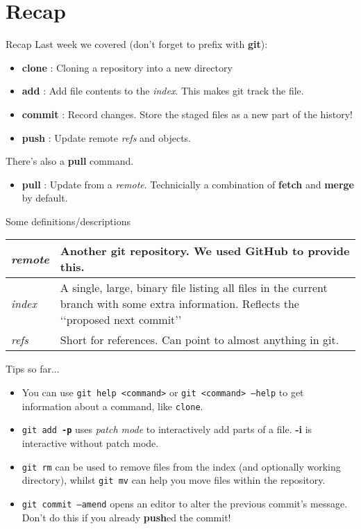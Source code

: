 \documentclass{beamer}
\begin{document}
\section{Recap}
\begin{frame}{Recap}
  Last week we covered (don't forget to prefix with \textbf{git}):
  \begin{itemize}
    \item \textbf{clone} : Cloning a repository into a new directory
    \item \textbf{add} : Add file contents to the \textit{index}. This makes git track the file.
    \item \textbf{commit} : Record changes. Store the staged files as a new part of the history!
    \item \textbf{push} : Update remote \textit{refs} and objects.
	\end{itemize}
	There\rq{}s also a \textbf{pull} command.
	\begin{itemize}
		\item \textbf{pull} : Update from a \textit{remote}. Technicially a combination of \textbf{fetch} and \textbf{merge} by default.
	\end{itemize}
\end{frame}

\begin{frame}{Some definitions/descriptions}
	\renewcommand{\arraystretch}{2.5}
	\begin{tabular}{m{}m{}}
	  \textit{remote} & Another git repository. \newline We used GitHub to provide this. \\
	  \hline
  		\textit{index} & A single, large, binary file listing all files in the current branch with some extra information. \newline Reflects the \lq\lq{}proposed next commit\rq\rq{} \\
  		\hline
	  \textit{refs} & Short for references. \newline Can point to almost anything in git.
  \end{tabular}
  	\renewcommand{\arraystretch}{1}
\end{frame}

\begin{frame}{Tips so far...}
  \begin{itemize}
    \item You can use \texttt{git help <command>} or \texttt{git <command> --help} to get information about a command, like \texttt{clone}.
    \item \texttt{git add \textbf{-p}} uses \textit{patch mode} to interactively add parts of a file. \textbf{-i} is interactive without patch mode.
    \item \texttt{git rm} can be used to remove files from the index (and optionally working directory), whilst \texttt{git mv} can help you move files within the repository.
    \item \texttt{git commit --amend} opens an editor to alter the previous commit's message. Don't do this if you already \textbf{push}ed the commit!
  \end{itemize}
\end{frame}
\end{document}
